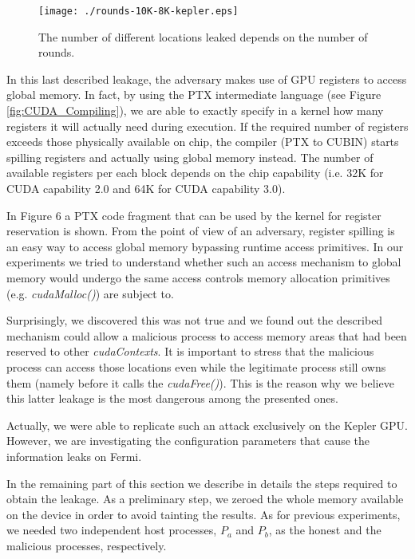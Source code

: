 \documentclass[11pt,onecolumn,letterpaper]{IEEEtran}
\begin{document}
\begin{figure}
	\centering
	\texttt{[image: ./rounds-10K-8K-kepler.eps]}
	\caption{The number of different locations leaked depends on the number of rounds.}
	\label{fig:reg-rounds-kepler}
\end{figure}

In this last described leakage, the adversary makes use of GPU registers to access global memory.
In fact, by using the PTX intermediate language (see Figure \ref{fig:CUDA_Compiling}), 
we are able to exactly specify in a kernel how many registers it will actually need during execution.
If the required number of registers exceeds those physically available on chip,
the compiler (PTX to CUBIN) starts spilling registers and actually using global memory instead.
The number of available registers per each block depends on the chip capability
(i.e. 32K for CUDA capability 2.0 and 64K for CUDA capability 3.0). 

In Figure 6
a PTX code fragment that can be used by the kernel for register reservation is shown.
From the point of view of an adversary, register spilling is an easy way to access global memory bypassing runtime access primitives.
In our experiments we tried to understand whether such an access mechanism to global memory
would undergo the same access controls memory allocation primitives (e.g. \emph{cudaMalloc()}) are subject to.

Surprisingly, we discovered this was not true and we found out the described mechanism could allow a malicious process to access
memory areas that had been reserved to other \emph{cudaContexts}.
It is important to stress that the malicious process can access those locations
even while the legitimate process still owns them (namely before it calls the \emph{cudaFree()}).
This is the reason why we believe this latter leakage is the most dangerous among the presented ones.

Actually, we were able to replicate such an attack exclusively on the Kepler GPU.
However, we are investigating the configuration parameters that cause the information leaks on Fermi. 

In the remaining part of this section we describe in details the steps required to obtain the leakage. 
As a preliminary step, we zeroed the whole memory available on the device in order to avoid tainting the results. 
As for previous experiments, we needed two independent host processes, $P_a$ and $P_b$, as the honest and the malicious processes, respectively.
\end{document}
